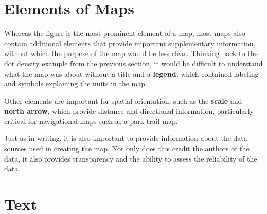\documentclass[
]{book}
\begin{document}
\hypertarget{elements-of-maps}{%
\section{Elements of Maps}\label{elements-of-maps}}

Whereas the figure is the most prominent element of a map, most maps also contain additional elements that provide important supplementary information, without which the purpose of the map would be less clear. Thinking back to the dot density example from the previous section, it would be difficult to understand what the map was about without a title and a \textbf{legend}, which contained labeling and symbols explaining the units in the map.

Other elements are important for spatial orientation, such as the \textbf{scale} and \textbf{north arrow}, which provide distance and directional information, particularly critical for navigational maps such as a park trail map.

Just as in writing, it is also important to provide information about the data sources used in creating the map. Not only does this credit the authors of the data, it also provides transparency and the ability to assess the reliability of the data.

\hypertarget{text}{%
\section{Text}\label{text}}
\end{document}
